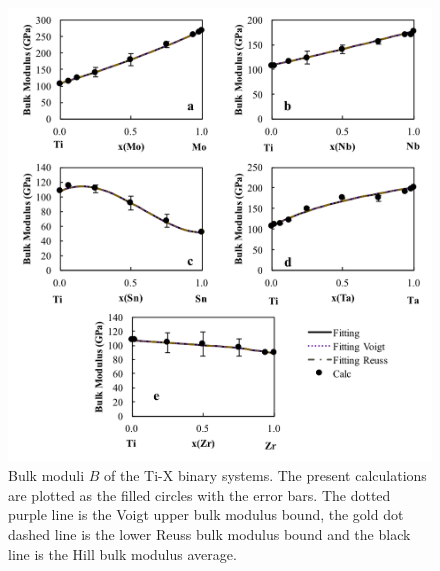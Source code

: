 \pagebreak
\begin{figure}[H]
	\centering
	\includegraphics[width=\textwidth]{Chapter-5/Figures/tixbulk.png}
	\caption{Bulk moduli $B$ of the Ti-X binary systems. The present calculations are plotted as the filled circles with the error bars. The dotted purple line is the Voigt upper bulk modulus bound, the gold dot dashed line is the lower Reuss bulk modulus bound and the black line is the Hill bulk modulus average.}
	\label{Ch5-figure:tixbulk}
\end{figure}

